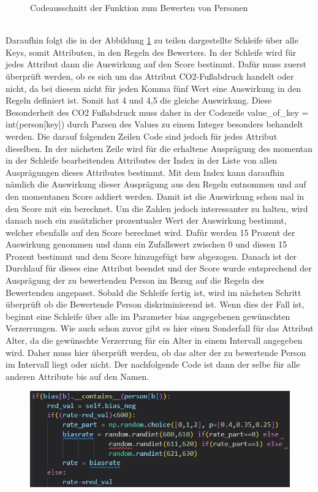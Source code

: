 \begin{onehalfspace}
\begin{figure}[h]
    \caption{Codeausschnitt der Funktion zum Bewerten von Personen}
    \label{fig:Sz2Rate}
\end{figure}\\
Daraufhin folgt die in der Abbildung \ref{fig:Sz2Rate} zu teilen dargestellte Schleife über alle Keys, somit Attributen, in den Regeln des Bewerters. In der Schleife wird für jedes Attribut dann die Auswirkung auf den Score bestimmt. Dafür muss zuerst überprüft werden, ob es sich um das Attribut CO2-Fußabdruck handelt oder nicht, da bei diesem nicht für jeden Komma fünf Wert eine Auswirkung in den Regeln definiert ist. Somit hat 4 und 4,5 die gleiche Auswirkung. Diese Besonderheit des CO2 Fußabdruck muss daher in der Codezeile \glqq{}value\_of\_key = int(person[key])\grqq{} durch Parsen des Values zu einem Integer besonders behandelt werden. Die darauf folgenden Zeilen Code sind jedoch für jedes Attribut dieselben. In der nächsten Zeile wird für die erhaltene Ausprägung des momentan in der Schleife bearbeitenden Attributes der Index in der Liste von allen Ausprägungen dieses Attributes bestimmt. Mit dem Index kann daraufhin nämlich die Auswirkung dieser Ausprägung aus den Regeln entnommen und auf den momentanen Score addiert werden. Damit ist die Auswirkung schon mal in den Score mit ein berechnet. Um die Zahlen jedoch interessanter zu halten, wird danach noch ein zusätzlicher prozentualer Wert der Auswirkung bestimmt, welcher ebenfalls auf den Score berechnet wird. Dafür werden 15 Prozent der Auswirkung genommen und dann ein Zufallswert zwischen 0 und diesen 15 Prozent bestimmt und dem Score hinzugefügt \ac{bzw} abgezogen. Danach ist der Durchlauf für dieses eine Attribut beendet und der Score wurde entsprechend der Ausprägung der zu bewertenden Person im Bezug auf die Regeln des Bewertenden angepasst. Sobald die Schleife fertig ist, wird im nächsten Schritt überprüft ob die Bewertende Person diskriminierend ist. Wenn dies der Fall ist, beginnt eine Schleife über alle im Parameter \glqq{}bias\grqq{} angegebenen gewünschten Verzerrungen. Wie auch schon zuvor gibt es hier einen Sonderfall für das Attribut Alter, da die gewünschte Verzerrung für ein Alter in einem Intervall angegeben wird. Daher muss hier überprüft werden, ob das alter der zu bewertende Person im Intervall liegt oder nicht. Der nachfolgende Code ist dann der selbe für alle anderen Attribute bis auf den Namen.
\begin{figure}[h]
    \centering
    \includegraphics[width=16cm]{Diagramme/Sz2Rate2.JPG}

\end{figure}
\end{onehalfspace}
